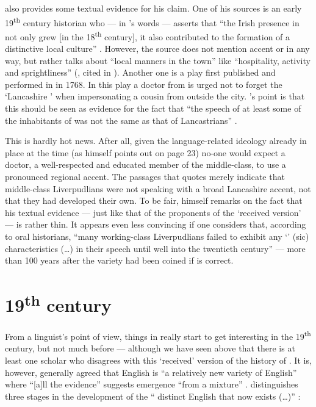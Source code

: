\citeauthor{crowley2012} also provides some textual evidence for his claim. One of his sources is an early 19\textsuperscript{th} century historian who --- in \citeauthor{crowley2012}'s words --- asserts that ``the Irish presence in  not only grew [in the 18\textsuperscript{th} century], it also contributed to the formation of a distinctive local culture'' \citeyearpar[30]{crowley2012}.
However, the source does not mention accent or  in any way, but rather talks about ``local manners in the town'' like ``hospitality, activity and sprightliness'' (\citealt{troughton1810}, cited in \citealt[30]{crowley2012}).
Another one is a play first published and performed in  in 1768.
In this play a doctor from  is urged not to forget the `Lancashire ' when impersonating a cousin from outside the city.
\citeauthor{crowley2012}'s point is that this should be seen as evidence for the fact that ``the speech of at least some of the inhabitants of  was not the same as that of Lancastrians'' \cite[cf.][32--35]{crowley2012}.

This is hardly hot news.
After all, given the language-related ideology already in place at the time (as \citeauthor{crowley2012} himself points out on page 23) no-one would expect a doctor, a well-respected and educated member of the middle-class, to use a pronounced regional accent.
The passages that \citeauthor{crowley2012} quotes merely indicate that middle-class Liverpudlians were not speaking with a broad Lancashire accent, not that they had developed their own.
To be fair, \citeauthor{crowley2012} himself remarks on the fact that his textual evidence --- just like that of the proponents of the `received version' --- is rather thin.
It appears even less convincing if one considers that, according to oral historians, ``many working-class Liverpudlians failed to exhibit any `' (sic) characteristics (\ldots) in their speech until well into the twentieth century''  \citep[43--44]{belchem2006d} --- more than 100 years after the variety had been coined if \citeauthor{crowley2012} is correct.


	\section{19\textsuperscript{th} century}\label{sec.hist.19}

From a linguist's point of view, things in  really start to get interesting in the 19\textsuperscript{th} century, but not much before --- although we have seen above that there is at least one scholar who disagrees with this `received' version of the history of .
It is, however, generally agreed that  English is ``a relatively new variety of English'' where ``[a]ll the evidence'' suggests emergence ``from a  mixture'' \citep[113 and 121]{honeybone2007}.
\citeauthor{honeybone2007} distinguishes three stages in the development of the `` distinct  English that now exists (\dots)'' \citeyearpar[119]{honeybone2007}:

